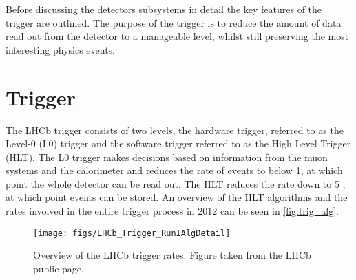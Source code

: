 Before discussing the detectors subsystems in detail the key features of the trigger are outlined. The purpose of the trigger is to reduce the amount of data read out from the detector to a manageable level, whilst still preserving the most interesting physics events.
\section{Trigger}
\label{sec:trig}
The LHCb trigger consists of two levels, the hardware trigger, referred to as the Level-0 (\Gls{L0}) trigger and the software trigger referred to as the High Level Trigger (\Gls{HLT}). The L0 trigger makes decisions based on information from the muon systems and the calorimeter and reduces the rate of events to below 1\mhz, at which point the whole detector can be read out. The HLT reduces the rate down to 5 \khz, at which point events can be stored. %
An overview of the HLT algorithms and the rates involved in the entire trigger process in 2012 can be seen in \autoref{fig:trig_alg}.


\begin{figure}[!h]
  \centering
    \texttt{[image: figs/LHCb\_Trigger\_RunIAlgDetail]} 
  \caption{Overview of the LHCb trigger rates. Figure taken from the LHCb public page.}%
  
  \label{fig:trig_alg}
\end{figure}



